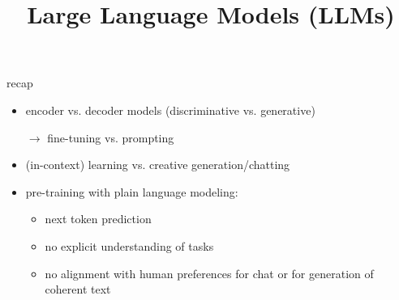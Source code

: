 



\newcommand{\learninggoals}{
\item comprehend the different subtleties in the space between supervised fine-tuning and zero-shot prompting}

\def\myblue#1{\textcolor{texblue}{#1}}

\title{Large Language Models (LLMs)}
\date{}




\begin{frame}{recap}

\vfill

\begin{itemize}
    \item encoder vs. decoder models (discriminative vs. generative)
    \item[$\to$] fine-tuning vs. prompting
    \item (in-context) learning vs. creative generation/chatting
    \item pre-training with plain language modeling:
        \begin{itemize}
            \item next token prediction
            \item no explicit understanding of tasks
            \item no alignment with human preferences for
    chat or for generation of coherent text
        \end{itemize}
\end{itemize}

\vfill

\end{frame}


